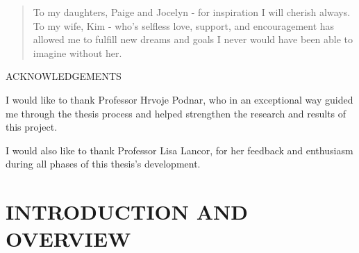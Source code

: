 \documentclass[12pt]{report}
\newenvironment{dedication}
	{\vspace{6ex}\begin{quotation}\begin{center}\begin{em}}
	{\par\end{em}\end{center}\end{quotation}}
\begin{document}
\begin{dedication}
\setcounter{page}{4}
To my daughters, Paige and Jocelyn - for inspiration I will cherish always.
\linebreak\linebreak
To my wife, Kim - who’s selfless love, support, and encouragement has allowed me to fulfill new dreams and goals I never would have been able to imagine without her.
\end{dedication}


\newpage
\thispagestyle{plain}
\setcounter{page}{5}
\vspace{2in}
\begin{center}
\MakeTextUppercase{\large{Acknowledgements}} \\
\end{center}

I would like to thank Professor Hrvoje Podnar, who  in an exceptional way guided me through the thesis process and helped strengthen the research and results of this project.

I would also like to thank Professor Lisa Lancor, for her feedback and enthusiasm during all phases of this thesis's development.

\newpage


\tableofcontents
\listoffigures




\chapter{INTRODUCTION AND OVERVIEW}
\end{document}
